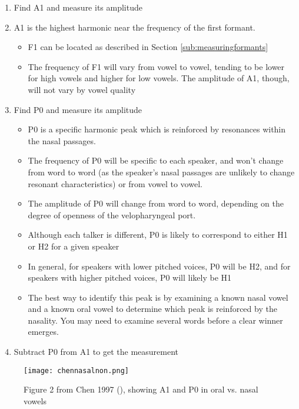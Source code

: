 \begin{enumerate}
\def\labelenumi{\arabic{enumi}.}
\tightlist
\item
  Find A1 and measure its amplitude
\item
  A1 is the highest harmonic near the frequency of the first formant.

  \begin{itemize}
  \tightlist
  \item
    F1 can be located as described in Section
    \ref{sub:measuringformants}
  \item
    The frequency of F1 will vary from vowel to vowel, tending to be
    lower for high vowels and higher for low vowels. The amplitude of
    A1, though, will not vary by vowel quality
  \end{itemize}
\item
  Find P0 and measure its amplitude

  \begin{itemize}
  \tightlist
  \item
    P0 is a specific harmonic peak which is reinforced by resonances
    within the nasal passages.
  \item
    The frequency of P0 will be specific to each speaker, and won't
    change from word to word (as the speaker's nasal passages are
    unlikely to change resonant characteristics) or from vowel to vowel.
  \item
    The amplitude of P0 will change from word to word, depending on the
    degree of openness of the velopharyngeal port.
  \item
    Although each talker is different, P0 is likely to correspond to
    either H1 or H2 for a given speaker
  \item
    In general, for speakers with lower pitched voices, P0 will be H2,
    and for speakers with higher pitched voices, P0 will likely be H1
  \item
    The best way to identify this peak is by examining a known nasal
    vowel and a known oral vowel to determine which peak is reinforced
    by the nasality. You may need to examine several words before a
    clear winner emerges.
  \end{itemize}
\item
  Subtract P0 from A1 to get the measurement
\end{enumerate}

\begin{figure}
  \centerline{
    \mbox{\texttt{[image: chennasalnon.png]}}
  }
  \caption{Figure 2 from Chen 1997 (\cite{Chen:1997vr}), showing A1 and P0 in oral vs. nasal vowels \label{chennasalnon}}

  \end{figure}

